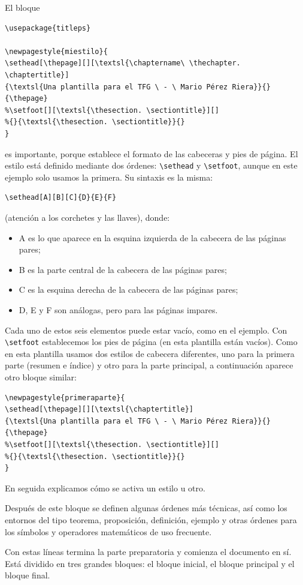 \documentclass[11pt]{book}
\theoremstyle{plain} %
\theoremstyle{definition} %
\begin{document}
El bloque
\begin{verbatim}
\usepackage{titleps}

\newpagestyle{miestilo}{
\sethead[\thepage][][\textsl{\chaptername\ \thechapter. \chaptertitle}]
{\textsl{Una plantilla para el TFG \ - \ Mario Pérez Riera}}{}{\thepage}
%\setfoot[][\textsl{\thesection. \sectiontitle}][]
%{}{\textsl{\thesection. \sectiontitle}}{}
}
\end{verbatim}
es importante, porque establece el formato de las cabeceras y pies de 
página. El estilo está definido mediante dos 
órdenes: \verb"\sethead" y \verb"\setfoot", aunque en este ejemplo solo usamos la 
primera. Su sintaxis es la misma:
\begin{verbatim}
\sethead[A][B][C]{D}{E}{F}
\end{verbatim}
(atención a los corchetes y las llaves), donde:
\begin{itemize}
\item A es lo que aparece en la esquina izquierda de la cabecera de las páginas 
pares;
\item B es la parte central de la cabecera de las páginas pares;
\item C es la esquina derecha de la cabecera de las páginas pares;
\item D, E y F son análogas, pero para las páginas impares.
\end{itemize}
Cada uno de estos seis elementos puede estar vacío, como en el ejemplo. Con 
\verb"\setfoot" establecemos los pies de página (en esta plantilla están vacíos). Como en esta plantilla usamos dos estilos de cabecera diferentes, uno para la primera parte (resumen e índice) y otro para la parte principal, a continuación aparece otro bloque similar:
\begin{verbatim}
\newpagestyle{primeraparte}{
\sethead[\thepage][][\textsl{\chaptertitle}]
{\textsl{Una plantilla para el TFG \ - \ Mario Pérez Riera}}{}{\thepage}
%\setfoot[][\textsl{\thesection. \sectiontitle}][]
%{}{\textsl{\thesection. \sectiontitle}}{}
}
\end{verbatim}

En seguida explicamos cómo se activa un estilo u otro.

Después de este bloque se definen algunas órdenes más técnicas, así como los 
entornos del tipo teorema, proposición, 
definición, ejemplo y otras órdenes para los símbolos y operadores 
matemáticos de uso frecuente.

Con estas líneas termina la parte preparatoria y comienza el documento en sí.
Está dividido en tres grandes bloques: el bloque inicial, el bloque principal y 
el bloque final.
\end{document}
